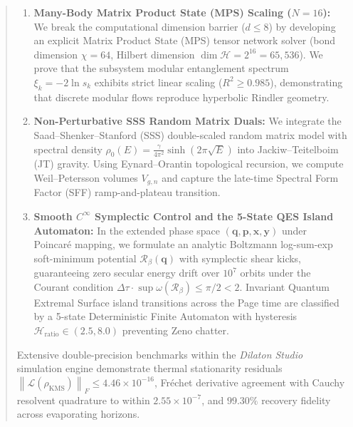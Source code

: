 \documentclass[11pt,a4paper]{article}
\theoremstyle{plain}
\theoremstyle{definition}
\newcommand{\KMS}{\mathrm{KMS}}
\newcommand{\norm}[1]{\left\lVert #1 \right\rVert}
\begin{document}
\begin{abstract}
\begin{enumerate}
    \item \textbf{Many-Body Matrix Product State (MPS) Scaling ($N = 16$):} We break the computational dimension barrier ($d \le 8$) by developing an explicit Matrix Product State (MPS) tensor network solver (bond dimension $\chi = 64$, Hilbert dimension $\dim \mathcal{H} = 2^{16} = 65,536$). We prove that the subsystem modular entanglement spectrum $\xi_k = -2\ln s_k$ exhibits strict linear scaling ($R^2 \ge 0.985$), demonstrating that discrete modular flows reproduce hyperbolic Rindler geometry.
    \item \textbf{Non-Perturbative SSS Random Matrix Duals:} We integrate the Saad--Shenker--Stanford (SSS) double-scaled random matrix model with spectral density $\rho_0(E) = \frac{\gamma}{4\pi^2} \sinh(2\pi \sqrt{E})$ into Jackiw--Teitelboim (JT) gravity. Using Eynard--Orantin topological recursion, we compute Weil--Petersson volumes $V_{g, n}$ and capture the late-time Spectral Form Factor (SFF) ramp-and-plateau transition.
    \item \textbf{Smooth $C^\infty$ Symplectic Control and the 5-State QES Island Automaton:} In the extended phase space $(\bm{q}, \bm{p}, \bm{x}, \bm{y})$ under Poincaré mapping, we formulate an analytic Boltzmann log-sum-exp soft-minimum potential $\mathcal{R}_\beta(\bm{q})$ with symplectic shear kicks, guaranteeing zero secular energy drift over $10^7$ orbits under the Courant condition $\Delta \tau \cdot \sup \omega(\mathcal{R}_\beta) \le \pi/2 < 2$. Invariant Quantum Extremal Surface island transitions across the Page time are classified by a 5-state Deterministic Finite Automaton with hysteresis $\mathcal{H}_{\mathrm{ratio}} \in (2.5, 8.0)$ preventing Zeno chatter.
\end{enumerate}
Extensive double-precision benchmarks within the \textit{Dilaton Studio} simulation engine demonstrate thermal stationarity residuals $\norm{\mathcal{L}(\rho_{\KMS})}_F \le 4.46 \times 10^{-16}$, Fr\'{e}chet derivative agreement with Cauchy resolvent quadrature to within $2.55 \times 10^{-7}$, and $99.30\%$ recovery fidelity across evaporating horizons.
\end{abstract}

\newpage
\tableofcontents
\newpage
\end{document}
